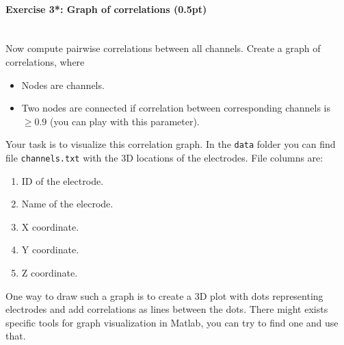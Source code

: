 \documentclass[a4paper,11pt]{article}
\newenvironment{exercise}[3]{\paragraph{Exercise #1: #2 (#3pt)}\ \\}{
\medskip}
\begin{document}
%
%
\begin{exercise}{3*}{Graph of correlations}{0.5}
Now compute pairwise correlations between all channels. Create a graph of correlations, where
\begin{itemize}
\itemsep 0em
	\item Nodes are channels.
	\item Two nodes are connected if correlation between corresponding channels is $\geq 0.9$ (you can play with this parameter).
\end{itemize}
Your task is to visualize this correlation graph. In the \texttt{data} folder you can find file \texttt{channels.txt} with the 3D locations of the electrodes. File columns are:
\begin{enumerate}
\itemsep 0em
	\item ID of the electrode.
	\item Name of the elecrode.
	\item X coordinate.
	\item Y coordinate.
	\item Z coordinate.
\end{enumerate}
One way to draw such a graph is to create a 3D plot with dots representing electrodes and add correlations as lines between the dots. There might exists specific tools for graph visualization in Matlab, you can try to find one and use that.
\end{exercise}
\end{document}
